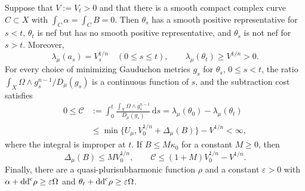 \begin{theorem}\label{thm:closed-core-subtraction}
Suppose that $V:=V_t>0$ and that there is a smooth compact complex curve $C\subset X$ with $\int_C\alpha=\int_CB=0$. Then $\theta_s$ has a smooth positive representative for $s<t$, $\theta_t$ is nef but has no smooth positive representative, and $\theta_s$ is not nef for $s>t$. Moreover,
\[
 \lambda_\mu(a_s)=V_s^{1/n}\quad(0\leq s\leq t),
 \qquad \lambda_\mu(\theta_t)\geq V^{1/n}>0.
\]
For every choice of minimizing Gauduchon metrics $g_s$ for $\theta_s$, $0\leq s<t$, the ratio $\int_X\Omega\wedge g_s^{n-1}/D_\mu(g_s)$ is a continuous function of $s$, and the subtraction cost satisfies
\begin{equation}\label{eq:closed-core-cost}
 \begin{split}
 0\leq\mathcal C
 &:=\int_0^t\frac{\int_X\Omega\wedge g_s^{n-1}}{D_\mu(g_s)}\,\mathrm{d}s
   =\lambda_\mu(\theta_0)-\lambda_\mu(\theta_t)\\
 &\leq\min\{U_\mu,V_0^{1/n}+\Delta_\mu(B)\}-V^{1/n}<\infty,
 \end{split}
\end{equation}
where the integral is improper at $t$. If $B\leq M\kappa_0$ for a constant $M\geq0$, then
\[
 \Delta_\mu(B)\leq MV_0^{1/n},\qquad
 \mathcal C\leq(1+M)V_0^{1/n}-V^{1/n}.
\]
Finally, there are a quasi-plurisubharmonic function $\rho$ and a constant $\varepsilon>0$ with
$\alpha+\mathrm{dd}^{\mathrm{c}}\rho\geq\varepsilon\Omega$ and
$\theta_t+\mathrm{dd}^{\mathrm{c}}\rho\geq\varepsilon\Omega$.
\end{theorem}
